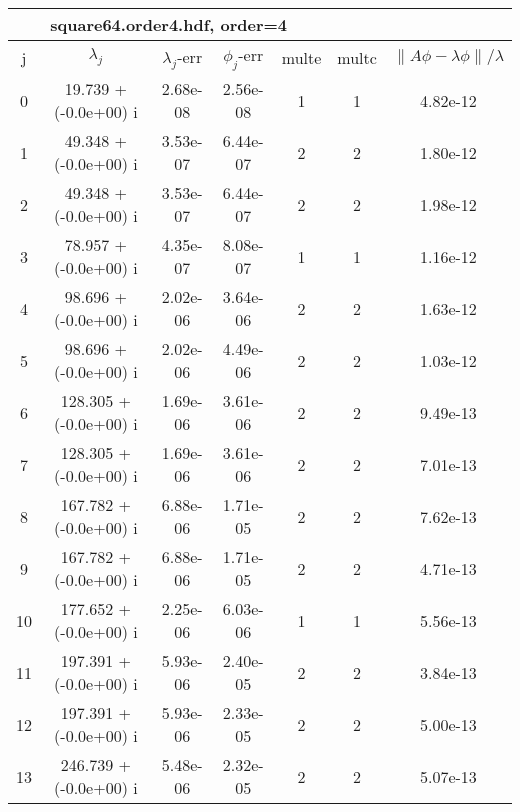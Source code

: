 \begin{table}[H]\tableFont %
\begin{center}
\begin{tabular}{|c|c|c|c|c|c|c|}  \hline
\multicolumn{5}{|c|}{square64.order4.hdf, order=4} \\ \hline
   j    &         $\lambda_j$        & $\lambda_j$-err  & $\phi_j$-err  & multe & multc & $\| A\phi - \lambda\phi\|/\lambda$     \\ \hline
     0  &     19.739 + (-0.0e+00) i  &    2.68e-08      &   2.56e-08    &   1    &  1   &    4.82e-12 \\
     1  &     49.348 + (-0.0e+00) i  &    3.53e-07      &   6.44e-07    &   2    &  2   &    1.80e-12 \\
     2  &     49.348 + (-0.0e+00) i  &    3.53e-07      &   6.44e-07    &   2    &  2   &    1.98e-12 \\
     3  &     78.957 + (-0.0e+00) i  &    4.35e-07      &   8.08e-07    &   1    &  1   &    1.16e-12 \\
     4  &     98.696 + (-0.0e+00) i  &    2.02e-06      &   3.64e-06    &   2    &  2   &    1.63e-12 \\
     5  &     98.696 + (-0.0e+00) i  &    2.02e-06      &   4.49e-06    &   2    &  2   &    1.03e-12 \\
     6  &    128.305 + (-0.0e+00) i  &    1.69e-06      &   3.61e-06    &   2    &  2   &    9.49e-13 \\
     7  &    128.305 + (-0.0e+00) i  &    1.69e-06      &   3.61e-06    &   2    &  2   &    7.01e-13 \\
     8  &    167.782 + (-0.0e+00) i  &    6.88e-06      &   1.71e-05    &   2    &  2   &    7.62e-13 \\
     9  &    167.782 + (-0.0e+00) i  &    6.88e-06      &   1.71e-05    &   2    &  2   &    4.71e-13 \\
    10  &    177.652 + (-0.0e+00) i  &    2.25e-06      &   6.03e-06    &   1    &  1   &    5.56e-13 \\
    11  &    197.391 + (-0.0e+00) i  &    5.93e-06      &   2.40e-05    &   2    &  2   &    3.84e-13 \\
    12  &    197.391 + (-0.0e+00) i  &    5.93e-06      &   2.33e-05    &   2    &  2   &    5.00e-13 \\
    13  &    246.739 + (-0.0e+00) i  &    5.48e-06      &   2.32e-05    &   2    &  2   &    5.07e-13 \\

\end{tabular}
\end{center}
\end{table}

